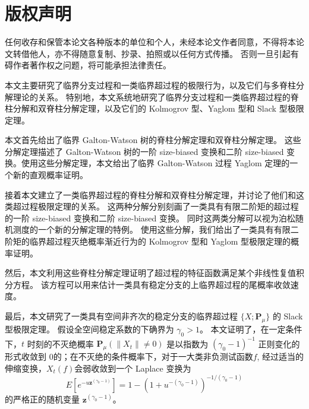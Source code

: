 \documentclass[UTF8]{pkuthss}
\theoremstyle{plain}
\theoremstyle{definition}
\numberwithin{equation}{section}
\begin{document}
\frontmatter
\pagestyle{empty}
\maketitle
\cleardoublepage
\chapter*{版权声明}
\thispagestyle{empty}
	任何收存和保管本论文各种版本的单位和个人，未经本论文作者同意，不得将本论文转借他人，亦不得随意复制、抄录、拍照或以任何方式传播。
	否则一旦引起有碍作者著作权之问题，将可能承担法律责任。
\cleardoublepage
\pagestyle{plain}
\setcounter{page}{0}
\begin{cabstract}
	本文主要研究了临界分支过程和一类临界超过程的极限行为，以及它们与多脊柱分解理论的关系。
	特别地，本文系统地研究了临界分支过程和一类临界超过程的脊柱分解和双脊柱分解定理，以及它们的 Kolmogrov 型、Yaglom 型和 Slack 型极限定理。

	本文首先给出了临界 Galton-Watson 树的脊柱分解定理和双脊柱分解定理。
	这些分解定理描述了 Galton-Watson 树的一阶 size-biased 变换和二阶 size-biased 变换。使用这些分解定理，本文给出了临界 Galton-Watson 过程 Yaglom 定理的一个新的直观概率证明。
	
	接着本文建立了一类临界超过程的脊柱分解和双脊柱分解定理，并讨论了他们和这类超过程极限定理的关系。
	这两种分解分别刻画了一类具有有限二阶矩的超过程的一阶 size-biased 变换和二阶 size-biased 变换。
	同时这两类分解可以视为泊松随机测度的一个新的分解定理的特例。
	使用这些分解，我们给出了一类具有有限二阶矩的临界超过程灭绝概率渐近行为的 Kolmogrov 型和 Yaglom 型极限定理的概率证明。
	
	然后，本文利用这些脊柱分解定理证明了超过程的特征函数满足某个非线性复值积分方程。
	该方程可以用来估计一类具有稳定分支的上临界超过程的尾概率收敛速度。
	
	最后，本文研究了一类具有空间非齐次的稳定分支的临界超过程 $\{X;\mathbf P_\mu\}$ 的 Slack 型极限定理。
	假设全空间稳定系数的下确界为 $\gamma_0 > 1$。
	本文证明了，在一定条件下，$t$ 时刻的不灭绝概率 $\mathbf P_{\mu}(\|X_t\|\neq 0)$ 是以指数为 $(\gamma_0-1)^{-1}$ 正则变化的形式收敛到 $0$的；在不灭绝的条件概率下，对于一大类非负测试函数$f$, 经过适当的伸缩变换，$X_t(f)$会弱收敛到一个 Laplace 变换为
\[
	E[e^{-u\mathbf z^{(\gamma_0-1)}}]=1-(1+u^{-(\gamma_0-1)})^{-1/(\gamma_0-1)}
\]
	的严格正的随机变量 $\mathbf z^{(\gamma_0-1)}$。
\end{cabstract}
\end{document}
